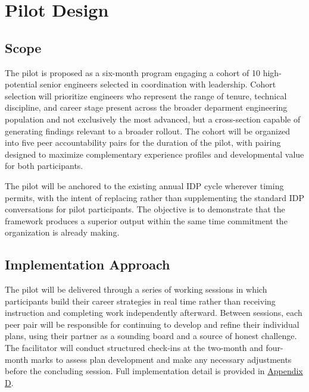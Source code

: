 \documentclass{article}
\begin{document}

\section{Pilot Design}

\subsection{Scope}

The pilot is proposed as a six-month program engaging a cohort of 10
high-potential senior engineers selected in coordination with leadership. Cohort
selection will prioritize engineers who represent the range of tenure, technical
discipline, and career stage present across the broader deparment engineering population 
and not exclusively the most advanced, but a cross-section capable of generating findings 
relevant to a broader rollout. The cohort will be organized into five peer accountability 
pairs for the duration of the pilot, with pairing designed to maximize complementary 
experience profiles and developmental value for both participants.

The pilot will be anchored to the existing annual IDP cycle wherever timing
permits, with the intent of replacing rather than supplementing the standard IDP
conversations for pilot participants. The objective is to demonstrate that the
framework produces a superior output within the same time commitment the
organization is already making.

\subsection{Implementation Approach}

The pilot will be delivered through a series of working sessions in which
participants build their career strategies in real time rather than receiving
instruction and completing work independently afterward. Between sessions, each
peer pair will be responsible for continuing to develop and refine their
individual plans, using their partner as a sounding board and a source of honest
challenge. The facilitator will conduct structured check-ins at the two-month
and four-month marks to assess plan development and make any necessary
adjustments before the concluding session. Full implementation detail is
provided in \hyperref[AppendixD]{Appendix D}.
\end{document}
